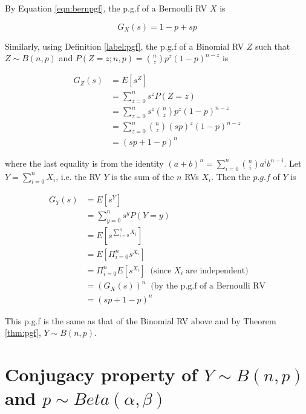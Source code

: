 \documentclass{article}
\begin{document}
\begin{flushleft}

By Equation \ref{eqn:bernpgf}, the p.g.f of a Bernoulli RV $X$ is

$$G_X(s) = 1-p+sp$$

Similarly, using Definition \ref{label:pgf}, the p.g.f of a Binomial RV $Z$ such that $Z \sim B(n,p)$ and $P(Z=z;n,p) = {n \choose z} p^z (1-p)^{n-z}$ is

\begin{equation}
\begin{split}
G_Z(s) &= E[s^Z] \\
&= \sum_{z=0}^n s^z P(Z=z) \\
&= \sum_{z=0}^n s^z {n \choose z} p^z (1-p)^{n-z} \\
&= \sum_{z=0}^n {n \choose z} (sp)^z (1-p)^{n-z} \\
&= (sp +1 - p)^n
\end{split}
\end{equation}

where the last equality is from the identity $(a + b)^n = \sum_{i=0}^n {n \choose i}a^i b^{n-i}$. Let $Y = \sum_{i=0}^n X_i$, i.e. the RV $Y$ is the sum of the $n$ RVs $X_i$. Then the $p.g.f$ of $Y$ is

\begin{equation}
\begin{split}
G_Y(s) &= E[s^Y] \\
&= \sum_{y=0}^n s^y P(Y=y) \\
&= E[s^{\sum_{i=0}^n X_i}] \\
&= E[\Pi_{i=0}^n s^{X_i}] \\
&= \Pi_{i=0}^n E[s^{X_i}] \;\; \text{(since} \; X_i \; \text{are independent)}\\
&= (G_X(s))^n \;\; \text{(by the p.g.f of a Bernoulli RV}\\
&= (sp +1 - p)^n
\end{split}
\end{equation}

This p.g.f is the same as that of the Binomial RV above and by Theorem \ref{thm:pgf}, $Y \sim B(n,p)$.

\end{flushleft}

\section{Conjugacy property of $Y \sim B(n,p)$ and $p \sim Beta(\alpha, \beta)$}\label{sec:conj}
\end{document}
